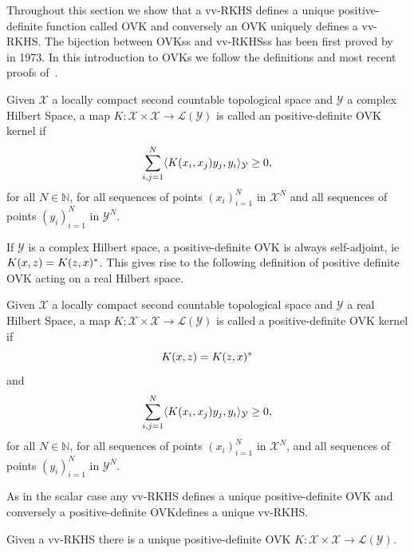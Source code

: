 Throughout this section we show that a \ac{vv-RKHS} defines a unique
positive-definite function called \acf{OVK} and conversely an \ac{OVK} uniquely
defines a \ac{vv-RKHS}. The bijection between \acsp{OVK}s and \acsp{vv-RKHS}s has
been first proved by~\citet{Senkene73} in 1973. In this introduction to
\acsp{OVK} we follow the definitions and most recent proofs
of~\citet{Carmeli2010}.
\begin{definition}
    \label{def:reproducing_kernel}
    Given $\mathcal{X}$ a locally compact second countable topological space
    and  $\mathcal{Y}$ a complex Hilbert Space, a map
    $K:\mathcal{X}\times\mathcal{X}\to\mathcal{L}(\mathcal{Y})$ is called an
    positive-definite \acl{OVK} kernel if
    \begin{dmath}
        \sum_{i,j=1}^N\inner{K(x_i,x_j)y_j,y_i}_{\mathcal{Y}}\ge 0,
    \end{dmath}
    for all $N\in\mathbb{N}$, for all sequences of points $(x_i)_{i=1}^N$ in
    $\mathcal{X}^N$ and all sequences of points $(y_i)_{i=1}^N$ in
    $\mathcal{Y}^N$. \label{def:ovk}
\end{definition}
If $\mathcal{Y}$ is a complex Hilbert space, a positive-definite \acl{OVK} is
always self-adjoint, \acs{ie}~$K(x,z)=K(z,x)^*$. This gives rise to the
following definition of positive definite \acl{OVK} acting on a real Hilbert
space.
\begin{definition}
    \label{def:reproducing_kernel_real} Given $\mathcal{X}$ a locally compact
    second countable topological space and $\mathcal{Y}$ a real Hilbert Space,
    a map $K:\mathcal{X}\times\mathcal{X}\to\mathcal{L}(\mathcal{Y})$ is called
    a positive-definite \acl{OVK} kernel if
    \begin{dmath}
        K(x,z)=K(z,x)^\adjoint
    \end{dmath}
    and
    \begin{dmath}
        \sum_{i,j=1}^N\inner{K(x_i,x_j)y_j,y_i}_{\mathcal{Y}}\ge 0,
    \end{dmath}
    for all $N\in\mathbb{N}$, for all sequences of points $(x_i)_{i=1}^N$ in
    $\mathcal{X}^N$, and all sequences of points  $(y_i)_{i=1}^N$ in
    $\mathcal{Y}^N$. \label{def:ovk_real}
\end{definition}
As in the scalar case any \acl{vv-RKHS} defines a unique positive-definite
\acl{OVK} and conversely a positive-definite \acl{OVK}defines a unique
\acl{vv-RKHS}.
\begin{proposition}
    \label{pr:unique_rkhs} Given a \acl{vv-RKHS} there is a unique
    positive-definite \acl{OVK}
    $K:\mathcal{X}\times\mathcal{X}\to\mathcal{L}(\mathcal{Y})$.
\end{proposition}
